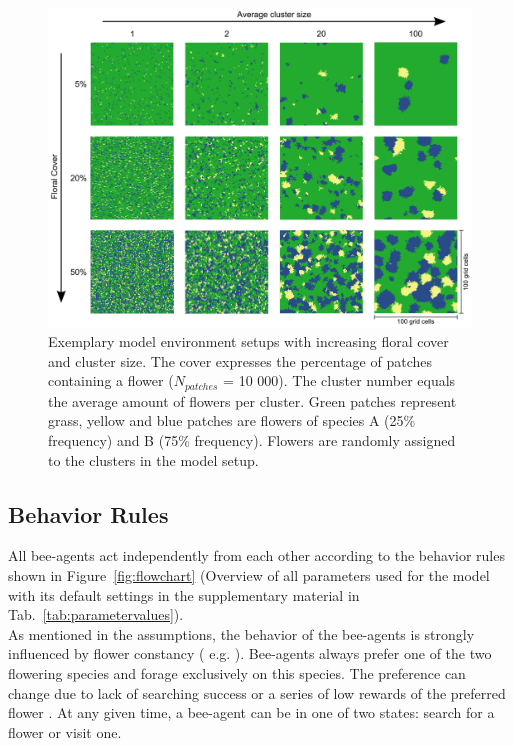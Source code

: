 \begin{figure} [!ht] %
	\centering
	\includegraphics[width=15cm]{Images/cluster}
	\caption{ Exemplary model environment setups with increasing floral cover and cluster size. The cover expresses the percentage of patches containing a flower ($N_{patches}$ = 10 000). The cluster number equals the average amount of flowers per cluster. Green patches represent grass, yellow and blue patches are flowers of species A (25\% frequency) and B (75\% frequency). Flowers are randomly assigned to the clusters in the model setup.}
	\label{fig:cluster}
\end{figure}


\subsection*{Behavior Rules}
All bee-agents act independently from each other according to the behavior rules shown in Figure~\ref{fig:flowchart} (Overview of all parameters used for the model with its default settings in the supplementary material in Tab.~\ref{tab:parametervalues}). \\
As mentioned in the assumptions, the behavior of the bee-agents is strongly influenced by flower constancy ( e.g. \citealp{bobisud1975pollinator, chittka1997foraging, thomson1981field, chittka1999flower,  goulson1994model,  goulson1999foraging}). Bee-agents always prefer one of the two flowering species and forage exclusively on this species. The preference can change due to lack of searching success or a series of low rewards of the preferred flower \citep{chittka1997foraging,kunin1993sex,greggers1993memory}. At any given time, a bee-agent can be in one of two states: search for a flower or visit one. 



